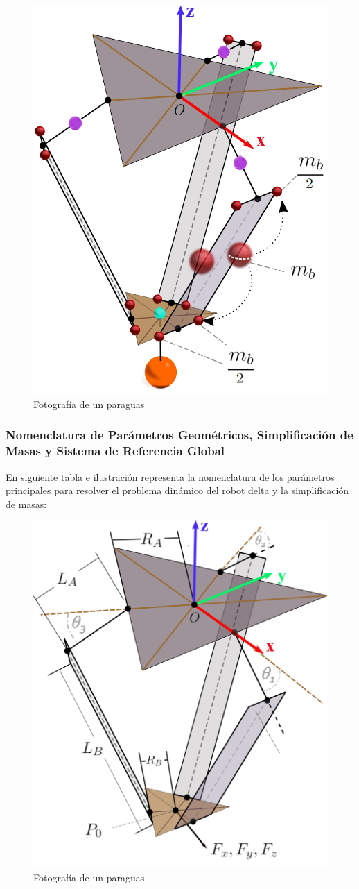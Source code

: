         \begin{figure}[H]
              \centering
	          \includegraphics[width=0.5\linewidth]{Main/Chapter4/Images4/DIBUJO39.jpg}
              \caption{Fotografía de un paraguas}
              \label{f:Cap4_Metodo_B_Modelacion_Dinamica_1}
        \end{figure}
        
                \newpage


        \subsubsection{Nomenclatura de Parámetros Geométricos, Simplificación de Masas y Sistema de Referencia Global }

        En siguiente tabla e ilustración representa la nomenclatura de los parámetros principales para resolver el problema dinámico del robot delta y la simplificación de masas:
        
        \begin{figure}[H]
              \centering
	          \includegraphics[width=0.55\linewidth]{Main/Chapter4/Images4/DIBUJO36.jpg}
              \caption{Fotografía de un paraguas}
              \label{f:Cap4_Metodo_B_Modelacion_Dinamica_2}
        \end{figure}



